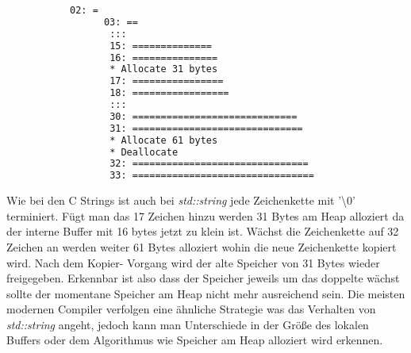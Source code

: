 \documentclass[MES,Master,ngerman]{twbook}%
\begin{document}
\begin{figure}[!htb]
	\begin{subfigure}[b]{0.5\textwidth}
		
		\label{lst:10}
	\end{subfigure}
	\begin{subfigure}[b]{0.5\textwidth}
	\begin{lstlisting}[gobble=6, title={Ausgabe Quellcode (20)}, language=bash, numbers=none]
	   02: =                                                                           
 	  03: ==                                                                          
	   :::                                                               
	   15: ==============                                                              
	   16: ===============                                                             
	   * Allocate 31 bytes                                                             
	   17: ================                                                            
	   18: =================                                                           
	   :::                                            
	   30: =============================                                               
	   31: ==============================                                              
	   * Allocate 61 bytes                                                             
	   * Deallocate                                                                    
	   32: ===============================                                               
	   33: ================================                                             	
	\end{lstlisting}
	\end{subfigure}
\end{figure}

Wie bei den C Strings ist auch bei \textit{std::string} jede Zeichenkette mit '\textbackslash 0' terminiert. Fügt man das 17 Zeichen hinzu werden 31 Bytes am Heap alloziert da der interne Buffer mit 16 bytes jetzt zu klein ist. Wächst die Zeichenkette auf 32 Zeichen an werden weiter 61 Bytes alloziert wohin die neue Zeichenkette kopiert wird. Nach dem Kopier- Vorgang wird der alte Speicher von 31 Bytes wieder freigegeben. Erkennbar ist also dass der Speicher jeweils um das doppelte wächst sollte der momentane Speicher am Heap nicht mehr ausreichend sein. Die meisten modernen Compiler verfolgen eine ähnliche Strategie was das Verhalten von \textit{std::string} angeht, jedoch kann man Unterschiede in der Größe des lokalen Buffers oder dem Algorithmus wie Speicher am Heap alloziert wird erkennen. \newpage
\end{document}
